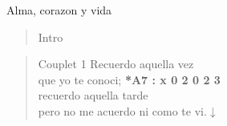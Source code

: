 \begin{song}[vals]{Alma, corazon y vida}
\begin{verse}{Intro}
	 \hspace{0.4cm} \hspace{0.4cm} \hspace{0.4cm} \hspace{0.4cm} \hspace{0.4cm}\hspace{0.4cm}  \hspace{0.4cm}
\end{verse}

\begin{verse}{Couplet 1}
	\hspace{0.6cm}Recuerdo aquella vez\\
	\hspace{0.6cm}que yo te conoci; \hspace{7cm} \small{\textbf{*A7 : x 0 2 0 2 3}}\\
	\hspace*{0.6cm}recuerdo aquella tarde\\
	\hspace*{0.6cm}pero no me acuerdo ni como te vi.\hspace{0.5cm}$\downarrow$
\end{verse}


\end{song}
